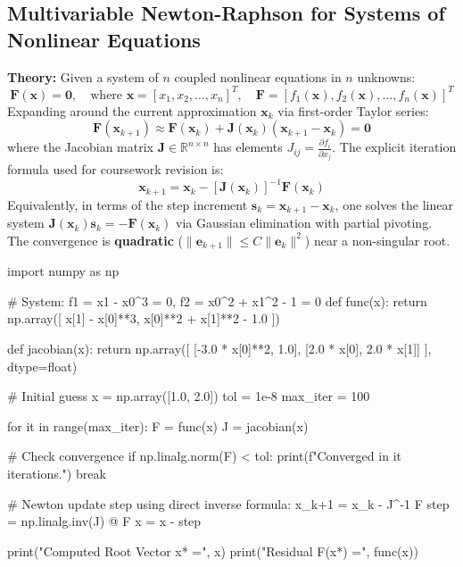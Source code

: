 \documentclass{article}
\begin{document}
\subsection{Multivariable Newton-Raphson for Systems of Nonlinear Equations}
\textbf{Theory:} Given a system of $n$ coupled nonlinear equations in $n$ unknowns:
$$\mathbf{F}(\mathbf{x}) = \mathbf{0}, \quad \text{where } \mathbf{x} = [x_1, x_2, \dots, x_n]^T, \quad \mathbf{F} = [f_1(\mathbf{x}), f_2(\mathbf{x}), \dots, f_n(\mathbf{x})]^T$$
Expanding around the current approximation $\mathbf{x}_k$ via first-order Taylor series:
$$\mathbf{F}(\mathbf{x}_{k+1}) \approx \mathbf{F}(\mathbf{x}_k) + \mathbf{J}(\mathbf{x}_k)(\mathbf{x}_{k+1} - \mathbf{x}_k) = \mathbf{0}$$
where the Jacobian matrix $\mathbf{J} \in \mathbb{R}^{n \times n}$ has elements $J_{ij} = \frac{\partial f_i}{\partial x_j}$.
The explicit iteration formula used for coursework revision is:
$$\mathbf{x}_{k+1} = \mathbf{x}_k - [\mathbf{J}(\mathbf{x}_k)]^{-1} \mathbf{F}(\mathbf{x}_k)$$
Equivalently, in terms of the step increment $\mathbf{s}_k = \mathbf{x}_{k+1} - \mathbf{x}_k$, one solves the linear system $\mathbf{J}(\mathbf{x}_k) \mathbf{s}_k = -\mathbf{F}(\mathbf{x}_k)$ via Gaussian elimination with partial pivoting.
The convergence is \textbf{quadratic} ($\|\mathbf{e}_{k+1}\| \le C \|\mathbf{e}_k\|^2$) near a non-singular root.

\begin{jupytercode}
import numpy as np

# System: f1 = x1 - x0^3 = 0,  f2 = x0^2 + x1^2 - 1 = 0
def func(x):
    return np.array([
        x[1] - x[0]**3,
        x[0]**2 + x[1]**2 - 1.0
    ])

def jacobian(x):
    return np.array([
        [-3.0 * x[0]**2, 1.0],
        [2.0 * x[0], 2.0 * x[1]]
    ], dtype=float)

# Initial guess
x = np.array([1.0, 2.0])
tol = 1e-8
max_iter = 100

for it in range(max_iter):
    F = func(x)
    J = jacobian(x)
    
    # Check convergence
    if np.linalg.norm(F) < tol:
        print(f"Converged in {it} iterations.")
        break
        
    # Newton update step using direct inverse formula: x_{k+1} = x_k - J^{-1} F
    step = np.linalg.inv(J) @ F
    x = x - step

print("Computed Root Vector x* =", x)
print("Residual F(x*) =", func(x))
\end{jupytercode}
\end{document}
